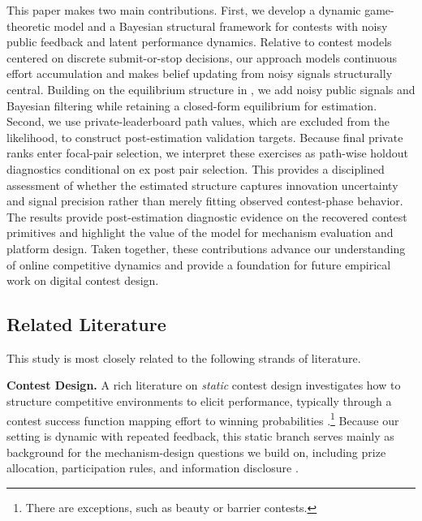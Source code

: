 \documentclass[mnsc]{informs3}
\begin{document}
This paper makes two main contributions.
First, we develop a dynamic game-theoretic model and a Bayesian structural framework for contests with noisy public feedback and latent performance dynamics.
Relative to contest models centered on discrete submit-or-stop decisions, our approach models continuous effort accumulation and makes belief updating from noisy signals structurally central.
Building on the equilibrium structure in \citet{Ryvkin2022Fight}, we add noisy public signals and Bayesian filtering while retaining a closed-form equilibrium for estimation.
Second, we use private-leaderboard path values, which are excluded from the likelihood, to construct post-estimation validation targets. Because final private ranks enter focal-pair selection, we interpret these exercises as path-wise holdout diagnostics conditional on ex post pair selection.
This provides a disciplined assessment of whether the estimated structure captures innovation uncertainty and signal precision rather than merely fitting observed contest-phase behavior.
The results provide post-estimation diagnostic evidence on the recovered contest primitives and highlight the value of the model for mechanism evaluation and platform design.
Taken together, these contributions advance our understanding of online competitive dynamics and provide a foundation for future empirical work on digital contest design.



\subsection{Related Literature}

This study is most closely related to the following strands of literature.

\textbf{Contest Design.}
A rich literature on \textit{static} contest design \citep{ales2017optimal_award} investigates how to structure competitive environments to elicit performance, typically through a contest success function mapping effort to winning probabilities \citep{skaperdas1996contest}.\footnote{There are exceptions, such as beauty or barrier contests.}
Because our setting is dynamic with repeated feedback, this static branch serves mainly as background for the mechanism-design questions we build on, including prize allocation, participation rules, and information disclosure \citep{moldovanu2001optimal, ales2021number_of_players, bergemann2022optimal}.
\end{document}
